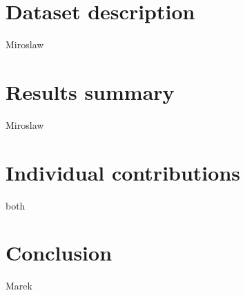 \documentclass[english]{article}
\begin{document}
	





\section{Dataset description}
Miroslaw

\section{Results summary}
Miroslaw
\section{Individual contributions}
both
\section{Conclusion}
Marek


\begin{thebibliography}{1}
	
	

\end{thebibliography}



\end{document}
